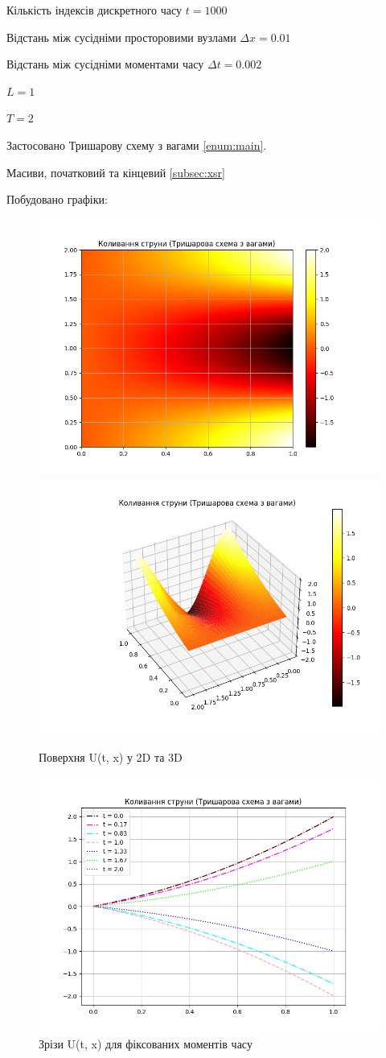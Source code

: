 \documentclass{article}
\begin{document}
        Кількість індексів дискретного часу $ t = 1000 $
        
        Відстань між сусідніми просторовими вузлами $ \Delta{x} = 0.01 $
        
        Відстань між сусідніми моментами часу $ \Delta{t} = 0.002 $

        $ L = 1 $

        $ T = 2 $

        Застосовано Тришарову схему з вагами \eqref{enum:main}.

        Масиви, початковий та кінцевий \eqref{subsec:xsr}

        Побудовано графіки:

        \begin{figure}[h!]
            \includegraphics[width=0.5\linewidth]{Main_2d.png}
            \includegraphics[width=0.5\linewidth]{Main_3d.png}
            \caption{Поверхня U(t, x) у 2D та 3D}
        \end{figure}

        \begin{figure}[h!]
            \centering
            \includegraphics[width=0.5\linewidth]{Main_key_time.png}
            \caption{Зрізи U(t, x) для фіксованих моментів часу}
        \end{figure}
\end{document}
